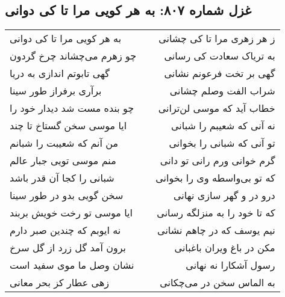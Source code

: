 \begin{center}
\section*{غزل شماره ۸۰۷: به هر کویی مرا تا کی دوانی}
\label{sec:807}
\begin{longtable}{l p{0.5cm} r}
به هر کویی مرا تا کی دوانی
&&
ز هر زهری مرا تا کی چشانی
\\
چو زهرم می‌چشاند چرخ گردون
&&
به تریاک سعادت کی رسانی
\\
گهی تابوتم اندازی به دریا
&&
گهی بر تخت فرعونم نشانی
\\
برآری برفراز طور سینا
&&
شراب الفت وصلم چشانی
\\
چو بنده مست شد دیدار خود را
&&
خطاب آید که موسی لن‌ترانی
\\
ایا موسی سخن گستاخ تا چند
&&
نه آنی که شعیبم را شبانی
\\
من آنم که شعیبت را شبانم
&&
تو آنی که شبانی را بخوانی
\\
منم موسی تویی جبار عالم
&&
گرم خوانی ورم رانی تو دانی
\\
شبانی را کجا آن قدر باشد
&&
که تو بی‌واسطه وی را بخوانی
\\
سخن گویی بدو در طور سینا
&&
درو در و گهر سازی نهانی
\\
ایا موسی تو رخت خویش بربند
&&
که تا خود را به منزلگه رسانی
\\
نه ایوبم که چندین صبر دارم
&&
نیم یوسف که در چاهم نشانی
\\
برون آمد گل زرد از گل سرخ
&&
مکن در باغ ویران باغبانی
\\
نشان وصل ما موی سفید است
&&
رسول آشکارا نه نهانی
\\
زهی عطار کز بحر معانی
&&
به الماس سخن در می‌چکانی
\\
\end{longtable}
\end{center}
